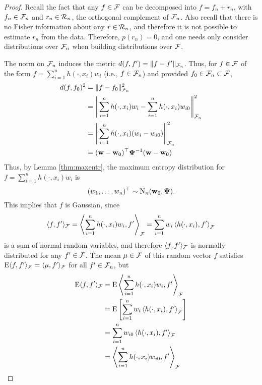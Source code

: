 \documentclass[a4paper,showframe,11pt,draft]{report}
\begin{document}
\begin{proof}
  Recall the fact that any $f \in {\mathcal F}$ can be decomposed into $f = f_n + r_n$, with $f_n \in {\mathcal F}_n$ and $r_n \in {\mathcal R}_n$, the orthogonal complement of ${\mathcal F}_n$.
  Also recall that there is no Fisher information about any $r \in {\mathcal R}_n$, and therefore it is not possible to estimate $r_n$ from the data.
  Therefore, $p(r_n) = 0$, and one needs only consider distributions over ${\mathcal F}_n$ when building distributions over ${\mathcal F}$.
  
  The norm on ${\mathcal F}_n$ induces the metric $d(f,f') = \lVert f - f'\rVert_{{\mathcal F}_n}$.
  Thus, for $f \in {\mathcal F}$ of the form $f = \sum_{i=1}^n h(\cdot,x_i)w_i$ (i.e., $f \in {\mathcal F}_n$) and provided $f_0 \in {\mathcal F}_n \subset {\mathcal F}$,
  \begin{align*}
    d(f,f_0)^2 
    &= \lVert f - f_0\rVert_{{\mathcal F}_n}^2 \\
    &= \left\Vert \sum_{i=1}^n h(\cdot,x_i)w_i - \sum_{i=1}^n h(\cdot,x_i)w_{i0} \right\Vert_{{\mathcal F}_n}^2 \\
    &= \left\Vert \sum_{i=1}^n h(\cdot,x_i)(w_i - w_{i0}) \right\Vert_{{\mathcal F}_n}^2 \\
    &= ({\mathbf w} - {\mathbf w}_0)^\top{\bm\Psi}^{-1} ({\mathbf w} - {\mathbf w}_0) \\
  \end{align*}
  Thus, by Lemma \ref{thm:maxentr}, the maximum entropy distribution for $f = \sum_{i=1}^n h(\cdot,x_i)w_i$ is
  \[
    (w_1,\dots,w_n)^\top \sim \operatorname{N}_n({\mathbf w}_0,{\bm\Psi}).
  \]
  This implies that $f$ is Gaussian, since
  \begin{align*}
    \langle f,f' \rangle_{{\mathcal F}}
    = \left\langle \sum_{i=1}^n h(\cdot,x_i)w_i, f' \right\rangle_{{\mathcal F}} 
    = \sum_{i=1}^n w_i \left\langle  h(\cdot,x_i), f' \right\rangle_{{\mathcal F}}  
  \end{align*}
  is a sum of normal random variables, and therefore $\langle f,f' \rangle_{{\mathcal F}}$ is normally distributed for any $f' \in {\mathcal F}$.
  The mean $\mu\in{\mathcal F}$ of this random vector $f$ satisfies $\operatorname{E}\langle f,f'\rangle_{{\mathcal F}}  = \langle\mu,f'\rangle_{{\mathcal F}}$ for all $f'\in{\mathcal F}_n$, but
  \begin{align*}
    \E\ip{f,f'}_{\cF}  
    &= \E \left\langle \sum_{i=1}^n h(\cdot,x_i)w_i, f' \right\rangle_{\cF} \\
    &= \E \left[ \sum_{i=1}^n w_i \left\langle  h(\cdot,x_i), f' \right\rangle_{\cF} \right] \\
    &= \sum_{i=1}^n w_{i0} \left\langle  h(\cdot,x_i), f' \right\rangle_{\cF} \\
    &= \left\langle \sum_{i=1}^n h(\cdot,x_i)w_{i0}, f' \right\rangle_{\cF} \\

\end{align*}
\end{proof}
\end{document}
